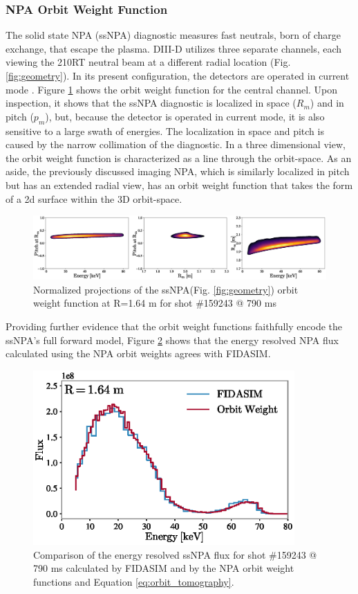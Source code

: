 \subsubsection{NPA Orbit Weight Function}
The solid state NPA (ssNPA) diagnostic measures fast neutrals, born of charge exchange, that escape the plasma. DIII-D utilizes three separate channels, each viewing the 210RT neutral beam at a different radial location (Fig. \ref{fig:geometry}). In its present configuration, the detectors are operated in current mode \cite{ssNPA2012}.
Figure \ref{fig:npa_orbit_weight} shows the orbit weight function for the central channel. Upon inspection, it shows that the ssNPA diagnostic is localized in space ($R_m$) and in pitch ($p_m$), but, because the detector is operated in current mode, it is also sensitive to a large swath of energies. The localization in space and pitch is caused by the narrow collimation of the diagnostic. In a three dimensional view, the orbit weight function is characterized as a line through the orbit-space. As an aside, the previously discussed imaging NPA\cite{du2018inpa}, which is similarly localized in pitch but has an extended radial view, has an orbit weight function that takes the form of a 2d surface within the 3D orbit-space.
\begin{figure}[h!]
    \centering
    \includegraphics[width=15cm]{figures/npa_orbit_weight_2.eps}
    \caption{Normalized projections of the ssNPA(Fig. \ref{fig:geometry}) orbit weight function at R=1.64 m for shot \#159243 @ 790 ms}
    \label{fig:npa_orbit_weight}
\end{figure}

Providing further evidence that the orbit weight functions faithfully encode the ssNPA's full forward model, Figure \ref{fig:npa_ow_flux} shows that the energy resolved NPA flux calculated using the NPA orbit weights agrees with FIDASIM. 
\begin{figure}[h!]
    \centering
    \includegraphics[width=10cm]{figures/npa_flux.eps}
    \caption{Comparison of the energy resolved ssNPA flux for shot \#159243 @ 790 ms calculated by FIDASIM and by the NPA orbit weight functions and Equation \ref{eq:orbit_tomography}.}
    \label{fig:npa_ow_flux}
\end{figure}

